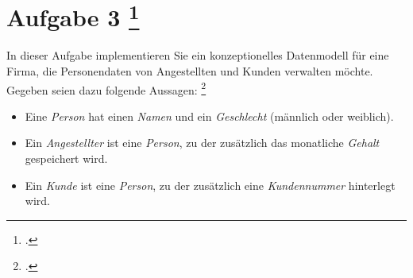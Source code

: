 \documentclass{lehramt-informatik-aufgabe}
\begin{document}

\section{Aufgabe 3
\footcite[Vererbung und Abstrakte Klassen II, Aufgabe 2]{aud:pu:7}}

In dieser Aufgabe implementieren Sie ein
konzeptionelles Datenmodell für eine Firma, die Personendaten von
Angestellten und Kunden verwalten möchte. Gegeben seien dazu folgende
Aussagen:
\footcite[Thema 1 Teilaufgabe 2 Aufgabe 3 Seite 5]{examen:66116:2015:03}

\begin{itemize}
\item Eine \emph{Person} hat einen \emph{Namen} und ein
\emph{Geschlecht} (männlich oder weiblich).

\item Ein \emph{Angestellter} ist eine \emph{Person}, zu der zusätzlich
das monatliche \emph{Gehalt} gespeichert wird.

\item Ein \emph{Kunde} ist eine \emph{Person}, zu der zusätzlich eine
\emph{Kundennummer} hinterlegt wird.
\end{itemize}
\end{document}
